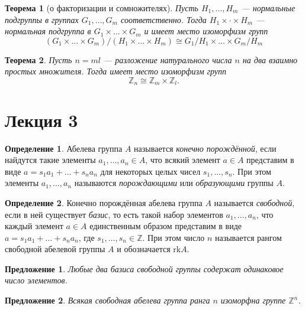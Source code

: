 \documentclass[a4paper]{article}
\theoremstyle{plain}
\newtheorem*{theorem}{Теорема}
\newtheorem{proposal}{Предложение}
\theoremstyle{definition}
\newtheorem{definition}{Определение}
\numberwithin{definition}{section}
\numberwithin{proposal}{section}
\newcommand{\rk}{\mathrm{rk}}
\begin{document}
\begin{theorem}[о факторизации и сомножителях]
Пусть \(H_1, \dots, H_m\) --- нормальные подгруппы в группах \(G_1, \dots, G_m\) соответственно. Тогда \(H_1 \times \cdot \times H_m\) --- нормальная подгруппа в \(G_1 \times \dots \times G_m\) и имеет место изоморфизм групп
\begin{equation*}
	(G_1 \times \dots \times G_m)/(H_1 \times \dots \times H_m) \cong G_1/H_1 \times \dots \times G_m/H_m
\end{equation*}
\end{theorem}

\begin{theorem}
Пусть \(n = ml\) --- разложение натурального числа \(n\) на два взаимно простых множителя. Тогда имеет место изоморфизм групп
\begin{equation*}
	\mathbb{Z}_n \cong \mathbb{Z}_m \times \mathbb{Z}_l.
\end{equation*}
\end{theorem}

\section{Лекция 3}

\begin{definition}
Абелева группа \(A\) называется \emph{конечно порождённой}, если найдутся такие элементы \(a_1, \dots, a_n \in A\), что всякий элемент \(a \in A\) представим в виде \(a = s_1a_1 + \dots + s_na_n\) для некоторых целых чисел \(s_1, \dots, s_n\). При этом элементы \(a_1, \dots, a_n\) называются \emph{порождающими} или \emph{образующими} группы \(A\).
\end{definition}

\begin{definition}
Конечно порождённая абелева группа \(A\) называется \emph{свободной}, если в ней существует \emph{базис}, то есть такой набор элементов \(a_1, \dots, a_n\), что каждый элемент \(a \in A\) единственным образом представим в виде \(a = s_1a_1 + \dots + s_na_n\), где \(s_1, \dots, s_n \in \mathbb{Z}\). При этом число \(n\) называется рангом свободной абелевой группы \(A\) и обозначается \(\rk A\).
\end{definition}

\begin{proposal}
Любые два базиса свободной группы содержат одинаковое число элементов.
\end{proposal}

\begin{proposal}
Всякая свободная абелева группа ранга \(n\) изоморфна группе \(\mathbb{Z}^n\).
\end{proposal}
\end{document}
